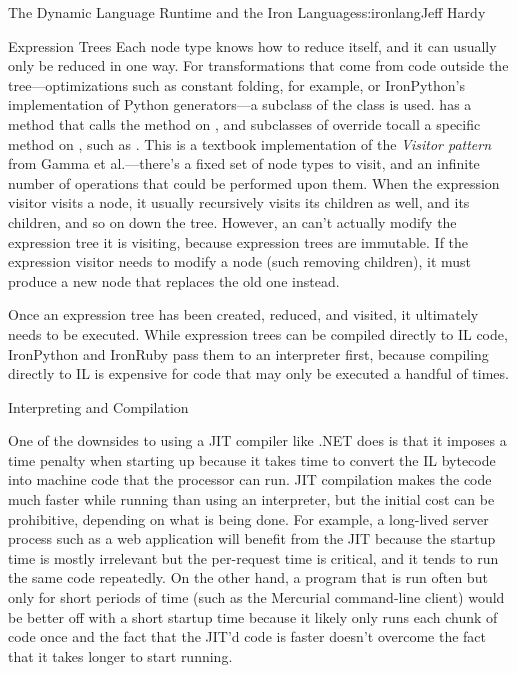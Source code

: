 \begin{aosachapter}{The Dynamic Language Runtime and the Iron Languages}{s:ironlang}{Jeff Hardy}
\begin{aosasect1}{Expression Trees}
Each node type knows how to reduce itself, and it can usually only be
reduced in one way. For transformations that come from code outside
the tree---optimizations such as constant folding, for example, or
IronPython's implementation of Python generators---a subclass of the
 class is used.  has a
 method that calls the  method on
, and subclasses of  override
 tocall a specific  method on
, such as . This is a
textbook implementation of the \emph{Visitor pattern} from Gamma et
al.---there's a fixed set of node types to visit, and an infinite
number of operations that could be performed upon them. When the
expression visitor visits a node, it usually recursively visits its
children as well, and its children, and so on down the tree. However,
an  can't actually modify the expression tree
it is visiting, because expression trees are immutable. If the
expression visitor needs to modify a node (such removing children), it
must produce a new node that replaces the old one instead.

Once an expression tree has been created, reduced, and visited, it
ultimately needs to be executed. While expression trees can be
compiled directly to IL code, IronPython and IronRuby pass them to an
interpreter first, because compiling directly to IL is expensive for
code that may only be executed a handful of times.

\end{aosasect1}

\begin{aosasect1}{Interpreting and Compilation}

One of the downsides to using a JIT compiler like .NET does is that it
imposes a time penalty when starting up because it takes time to
convert the IL bytecode into machine code that the processor can
run. JIT compilation makes the code much faster while running than
using an interpreter, but the initial cost can be prohibitive,
depending on what is being done. For example, a long-lived server
process such as a web application will benefit from the JIT because
the startup time is mostly irrelevant but the per-request time is
critical, and it tends to run the same code repeatedly. On the other
hand, a program that is run often but only for short periods of time
(such as the Mercurial command-line client) would be better off with a
short startup time because it likely only runs each chunk of code once
and the fact that the JIT'd code is faster doesn't overcome the fact
that it takes longer to start running.


\end{aosasect1}
\end{aosachapter}
